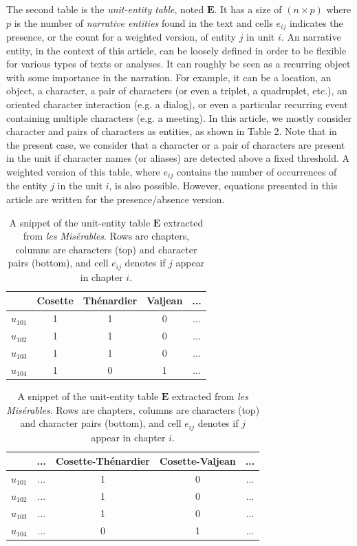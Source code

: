 \documentclass[
twocolumn,
]{ceurart}
\begin{document}
The second table is the \emph{unit-entity table}, noted $\mathbf{E}$. It has a size of $(n \times p)$ where $p$ is the number of \emph{narrative entities} found in the text and cells $e_{ij}$ indicates the presence, or the count for a weighted version, of entity $j$ in unit $i$. An narrative entity, in the context of this article, can be loosely defined in order to be flexible for various types of texts or analyses. It can roughly be seen as a recurring object with some importance in the narration. For example, it can be a location, an object, a character, a pair of characters (or even a triplet, a quadruplet, etc.), an oriented character interaction (e.g. a dialog), or even a particular recurring event containing multiple characters (e.g. a meeting). In this article, we mostly consider character and pairs of characters as entities, as shown in Table 2. Note that in the present case, we consider that a character or a pair of characters are present in the unit if character names (or aliases) are detected above a fixed threshold. A weighted version of this table, where $e_{ij}$ contains the number of occurrences of the entity $j$ in the unit $i$, is also possible. However, equations presented in this article are written for the presence/absence version.

\begin{table}[h]
	\scriptsize
	\begin{tabular}{|c||c|c|c|c|}
		\hline
		& Cosette & Thénardier & Valjean & ... \\
		\hline
		\hline 
		$u_{101}$ & 1 & 1 & 0 & ... \\
		\hline
		$u_{102}$ & 1 & 1 & 0 & ... \\
		\hline
		$u_{103}$ & 1 & 1 & 0 & ... \\
		\hline
		$u_{104}$ & 1 & 0 & 1 & ... \\
		\hline
	\end{tabular}
	\begin{tabular}{|c||c|c|c|c|}
		\hline
		& ... & Cosette-Thénardier & Cosette-Valjean & ... \\
		\hline
		\hline 
		$u_{101}$  	& ... & 1 & 0 &  ... \\
		\hline
		$u_{102}$ 	& ... & 1 & 0 & ... \\
		\hline
		$u_{103}$  	& ... & 1 & 0 & ... \\
		\hline
		$u_{104}$ 	& ... & 0 & 1 & ... \\
		\hline
	\end{tabular}
	\label{occ_table}
	\caption{A snippet of the unit-entity table $\mathbf{E}$ extracted from \emph{les Misérables}. Rows are chapters, columns are characters (top) and character pairs (bottom), and cell $e_{ij}$ denotes if $j$ appear in chapter $i$.}
\end{table}
\end{document}
